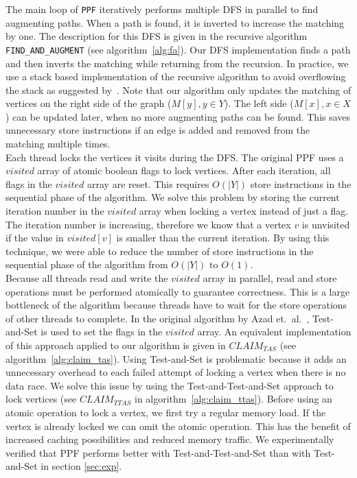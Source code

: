 \documentclass[letterpaper]{article}
\begin{document}
The main loop of \texttt{PPF} iteratively performs multiple DFS in parallel to find augmenting paths. 
When a path is found, it is inverted to increase the matching by one.
The description for this DFS is given in the recursive algorithm \texttt{FIND\_AND\_AUGMENT} (see algorithm~\ref{alg:fa}). 
Our DFS implementation finds a path and then inverts the matching while returning from the recursion. 
In practice, we use a stack based implementation of the recursive algorithm to avoid overflowing the stack as suggested by~\cite{Azad:2012}. 
Note that our algorithm only updates the matching of vertices on the right side of the graph ($M[y], y \in Y$). 
The left side ($M[x], x \in X$) can be updated later, when no more augmenting paths can be found. 
This saves unnecessary store instructions if an edge is added and removed from the matching multiple times.\\

Each thread locks the vertices it visits during the DFS. The original PPF uses a $visited$ array of atomic boolean flags to lock vertices. 
After each iteration, all flags in the $visited$ array are reset. This requires $O(|Y|)$ store instructions in the sequential phase of the algorithm. 
We solve this problem by storing the current iteration number in the $visited$ array when locking a vertex instead of just a flag. The iteration number is increasing, 
therefore we know that a vertex $v$ is unvisited if the value in $visited[v]$ is smaller than the current iteration. 
By using this technique, we were able to reduce the number of store instructions in the sequential phase of the algorithm from $O(|Y|)$ to $O(1)$.\\

Because all threads read and write the $visited$ array in parallel, read and store operations must be performed atomically to guarantee correctness. 
This is a large bottleneck of the algorithm because threads have to wait for the store operations of other threads to complete. 
In the original algorithm by Azad et.\ al.~\cite{Azad:2012}, Test-and-Set is used to set the flags in the $visited$ array. 
An equivalent implementation of this approach applied to our algorithm is given in \texttt{$CLAIM_{TAS}$} (see algorithm~\ref{alg:claim_tas}). 
Using Test-and-Set is problematic because it adds an unnecessary overhead to each failed attempt of locking a vertex when there is no data race. 
We solve this issue by using the Test-and-Test-and-Set approach to lock vertices (see \texttt{$CLAIM_{TTAS}$} in algorithm~\ref{alg:claim_ttas}).
Before using an atomic operation to lock a vertex, we first try a regular memory load. If the vertex is already locked we can omit the atomic operation. 
This has the benefit of increased caching possibilities and reduced memory traffic. 
We experimentally verified that PPF performs better with Test-and-Test-and-Set than with Test-and-Set in section \ref{sec:exp}.
\end{document}
